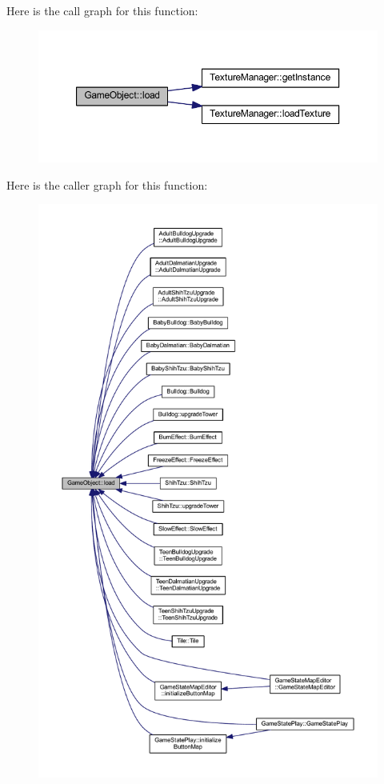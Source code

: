 Here is the call graph for this function\+:\nopagebreak
\begin{figure}[H]
\begin{center}
\leavevmode
\includegraphics[width=350pt]{class_game_object_acc593e5b75a58c4a59ad59da654ce807_cgraph}
\end{center}
\end{figure}




Here is the caller graph for this function\+:
\nopagebreak
\begin{figure}[H]
\begin{center}
\leavevmode
\includegraphics[width=350pt]{class_game_object_acc593e5b75a58c4a59ad59da654ce807_icgraph}
\end{center}
\end{figure}


